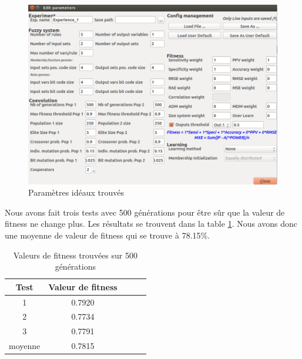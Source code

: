 \begin{figure}[h]
  \centering
    \includegraphics[width=0.8\linewidth]{img/values.png}
  \caption{Paramètres idéaux trouvés}
  \label{parameters}
\end{figure}

Nous avons fait trois tests avec 500 générations pour être sûr que la valeur de fitness ne change plus. Les résultats se trouvent dans la table \ref{resulttab500}. Nous avons donc une moyenne de valeur de fitness qui se trouve à 78.15\%.


\begin{table}[h!]
   \centering
   \begin{tabular}{|c|c|c|c|c|}
      \hline
      Test & Valeur de fitness \\
      \hline
      1 & 0.7920 \\
      2 & 0.7734 \\
      3 & 0.7791 \\
      \hline
      moyenne & 0.7815 \\
      \hline
   \end{tabular}
   \caption{\label{resulttab500} Valeurs de fitness trouvées sur 500 générations}
\end{table}



